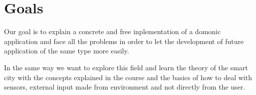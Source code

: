 \section{Goals}

Our goal is to explain a concrete and free inplementation of a domonic application and face all the problems in order to let the development of future application of the same type more easily.

In the same way we want to explore this field and learn the theory of the smart city with the concepts explained in the course and the basics of how to deal with sensors, external input made from environment and not directly from the user.


